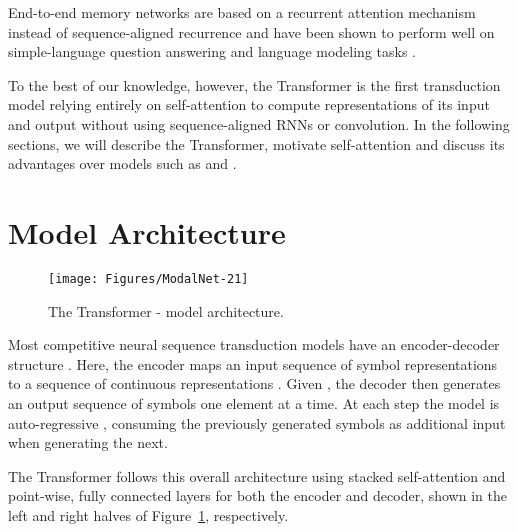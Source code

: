 \documentclass{article}
\begin{document}
End-to-end memory networks are based on a recurrent attention mechanism instead of sequence-aligned recurrence and have been shown to perform well on simple-language question answering and language modeling tasks \citep{sukhbaatar2015}.

To the best of our knowledge, however, the Transformer is the first transduction model relying entirely on self-attention to compute representations of its input and output without using sequence-aligned RNNs or convolution.
In the following sections, we will describe the Transformer, motivate self-attention and discuss its advantages over models such as \citep{neural_gpu, NalBytenet2017} and \citep{JonasFaceNet2017}.


























%
 
\section{Model Architecture}

\begin{figure}
  \centering
  \texttt{[image: Figures/ModalNet-21]}
  \caption{The Transformer - model architecture.}
  \label{fig:model-arch}
\end{figure}



Most competitive neural sequence transduction models have an encoder-decoder structure \citep{cho2014learning,bahdanau2014neural,sutskever14}. Here, the encoder maps an input sequence of symbol representations  to a sequence of continuous representations . Given , the decoder then generates an output sequence  of symbols one element at a time. At each step the model is auto-regressive \citep{graves2013generating}, consuming the previously generated symbols as additional input when generating the next.

The Transformer follows this overall architecture using stacked self-attention and point-wise, fully connected layers for both the encoder and decoder, shown in the left and right halves of Figure~\ref{fig:model-arch}, respectively.
\end{document}
